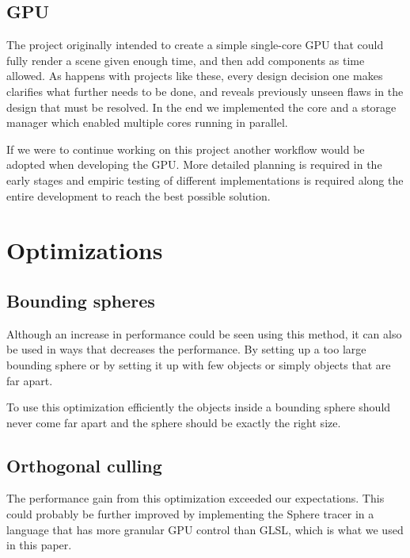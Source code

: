 		
		\subsection{GPU} 
		
			The project originally intended to create a simple single-core GPU
			that could fully render a scene given enough time, and then add	
			components as time allowed. As happens with projects like these,
			every design decision one makes clarifies what further needs to be
			done, and reveals previously unseen flaws in the design that must
			be resolved. In the end we implemented the core and a storage 
			manager which enabled multiple cores running in parallel.

            If we were to continue working on this project another workflow
            would be adopted when developing the GPU. More detailed planning is 
            required in the early stages and empiric testing of different 
            implementations is required along the entire development to reach
            the best possible solution.

	\section{Optimizations} \label{optimization}

		\subsection{Bounding spheres}
			
			Although an increase in performance could be seen using this
			method, it can also be used in ways that decreases the performance.
			By setting up a too large bounding sphere or by setting it up with
			few objects or simply objects that are far apart.

			To use this optimization efficiently the objects inside a bounding 
			sphere should never come far apart and the sphere should be exactly 
			the right size.

		\subsection{Orthogonal culling}

			The performance gain from this optimization exceeded our 
			expectations. This could probably be further improved by implementing the Sphere tracer in a language that has more granular GPU control than GLSL, which is what we used in this paper.

